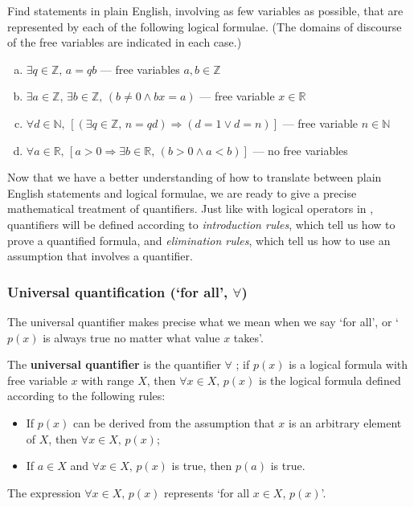 \begin{exercise}
\label{exLogicalFormulaeToEnglish}
Find statements in plain English, involving as few variables as possible, that are represented by each of the following logical formulae. (The domains of discourse of the free variables are indicated in each case.)
\begin{enumerate}[(a)]
\item $\exists q \in \mathbb{Z},\, a = qb$ --- free variables $a, b \in \mathbb{Z}$
\item $\exists a \in \mathbb{Z},\, \exists b \in \mathbb{Z},\, (b \ne 0 \wedge bx = a)$ --- free variable $x \in \mathbb{R}$
\item $\forall d \in \mathbb{N},\, [(\exists q \in \mathbb{Z},\, n=qd) \Rightarrow (d = 1 \vee d = n)]$ --- free variable $n \in \mathbb{N}$
\item $\forall a \in \mathbb{R},\, [a > 0 \Rightarrow \exists b \in \mathbb{R},\, (b > 0 \wedge a < b)]$ --- no free variables
\end{enumerate}
\end{exercise}

Now that we have a better understanding of how to translate between plain English statements and logical formulae, we are ready to give a precise mathematical treatment of quantifiers. Just like with logical operators in , quantifiers will be defined according to \textit{introduction rules}, which tell us how to prove a quantified formula, and \textit{elimination rules}, which tell us how to use an assumption that involves a quantifier.

\subsubsection*{Universal quantification (`for all', $\forall$)}

The universal quantifier makes precise what we mean when we say `for all', or `$p(x)$ is always true no matter what value $x$ takes'.

\begin{definition}
\label{defUniversalQuantifier}
The \textbf{universal quantifier} is the quantifier $\forall$ ; if $p(x)$ is a logical formula with free variable $x$ with range $X$, then $\forall x \in X,\, p(x)$ is the logical formula defined according to the following rules:
\begin{itemize}
\item \introrule{\forall} If $p(x)$ can be derived from the assumption that $x$ is an arbitrary element of $X$, then $\forall x \in X,\, p(x)$;
\item \elimrule{\forall} If $a \in X$ and $\forall x \in X,\, p(x)$ is true, then $p(a)$ is true.
\end{itemize}
The expression $\forall x \in X,\, p(x)$ represents `for all $x \in X$, $p(x)$'.
\end{definition}

